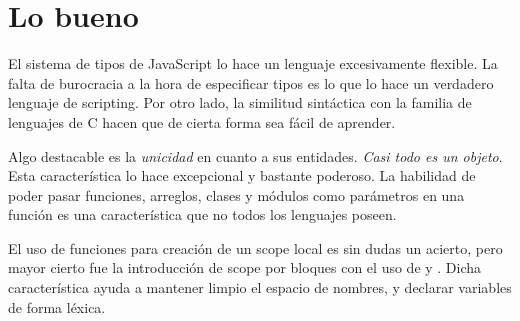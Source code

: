 \section*{Lo bueno}

El sistema de tipos de JavaScript lo hace un lenguaje excesivamente flexible. La falta de burocracia a la hora de especificar tipos es lo que lo hace un verdadero lenguaje de scripting. Por otro lado, la similitud sintáctica con la familia de lenguajes de C hacen que de cierta forma sea fácil de aprender. 

Algo destacable es la \textit{unicidad} en cuanto a sus entidades. \textit{Casi todo es un objeto}. Esta característica lo hace excepcional y bastante poderoso. La habilidad de poder pasar funciones, arreglos, clases y módulos como parámetros en una función es una característica que no todos los lenguajes poseen.

El uso de funciones para creación de un scope local es sin dudas un acierto, pero mayor cierto fue la introducción de scope por bloques con el uso de  y . Dicha característica ayuda a mantener limpio el espacio de nombres, y declarar variables de forma léxica.